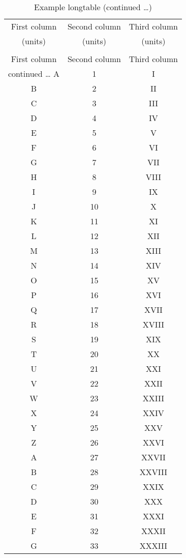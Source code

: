 \documentclass{umalayathesis}
\begin{document}
\begin{appendices}
\begin{longtable}{ccc}
    \caption{Example longtable.}\label{tab:longtable} \\
    \hline
    First column & Second column & Third column \\
    (units) & (units) & (units) \\
    \hline
    \endfirsthead
    \caption*{Example longtable (continued \dots)} \\
    \hline
    First column & Second column & Third column \\
    \hline
    \endhead
    \hline
    continued \dots
    \endfoot
    \hline
    \endlastfoot
    A & 1 & I \\
    B & 2 & II \\
    C & 3 & III \\
    D & 4 & IV \\
    E & 5 & V \\
    F & 6 & VI \\
    G & 7 & VII \\
    H & 8 & VIII \\
    I & 9 & IX \\
    J & 10 & X \\
    K & 11 & XI \\
    L & 12 & XII \\
    M & 13 & XIII \\
    N & 14 & XIV \\
    O & 15 & XV \\
    P & 16 & XVI \\
    Q & 17 & XVII \\
    R & 18 & XVIII \\
    S & 19 & XIX \\
    T & 20 & XX \\
    U & 21 & XXI \\
    V & 22 & XXII \\
    W & 23 & XXIII \\
    X & 24 & XXIV \\
    Y & 25 & XXV \\
    Z & 26 & XXVI \\
    A & 27 & XXVII \\
    B & 28 & XXVIII \\
    C & 29 & XXIX \\
    D & 30 & XXX \\
    E & 31 & XXXI \\
    F & 32 & XXXII \\
    G & 33 & XXXIII \\

\end{longtable}
\end{appendices}
\end{document}
